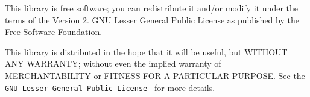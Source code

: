 This library is free software; you can redistribute it and/or modify it under the terms of the Version 2. G\-N\-U Lesser General Public License as published by the Free Software Foundation.

This library is distributed in the hope that it will be useful, but W\-I\-T\-H\-O\-U\-T A\-N\-Y W\-A\-R\-R\-A\-N\-T\-Y; without even the implied warranty of M\-E\-R\-C\-H\-A\-N\-T\-A\-B\-I\-L\-I\-T\-Y or F\-I\-T\-N\-E\-S\-S F\-O\-R A P\-A\-R\-T\-I\-C\-U\-L\-A\-R P\-U\-R\-P\-O\-S\-E. See the \href{http://www.gnu.org/licenses/lgpl-2.1.txt}{\tt G\-N\-U Lesser General Public License } for more details. 